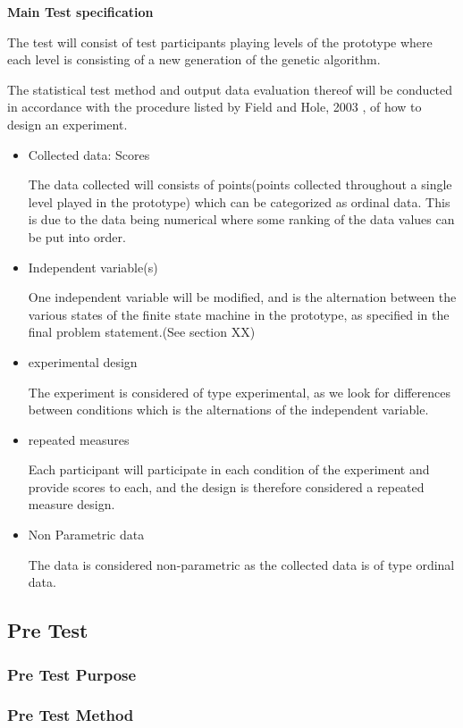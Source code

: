 \newpage
\textbf{Main Test specification}

The test will consist of test participants playing levels of the prototype where each level is consisting of a new generation of the genetic algorithm.

The statistical test method and output data evaluation thereof will be conducted in accordance with the procedure listed by Field and Hole, 2003 \cite[pp. 265-277]{Field2003}, of how to design an experiment.

\begin{itemize}
\item Collected data: Scores

The data collected will consists of points(points collected throughout a single level played in the prototype) which can be categorized as ordinal data. This is due to the data being numerical where some ranking of the data values can be put into order.
\item Independent variable(s)

One independent variable will be modified, and is the alternation between the various states of the finite state machine in the prototype, as specified in the final problem statement.(See section XX)
\item experimental design

The experiment is considered of type experimental, as we look for differences between conditions which is the alternations of the independent variable.
\item repeated measures

Each participant will participate in each condition of the experiment and provide scores to each, and the design is therefore considered a repeated measure design.
\item Non Parametric data

The data is considered non-parametric as the collected data is of type ordinal data.

\end{itemize}


\subsection{Pre Test}

\subsubsection{Pre Test Purpose}
\subsubsection{Pre Test Method}
